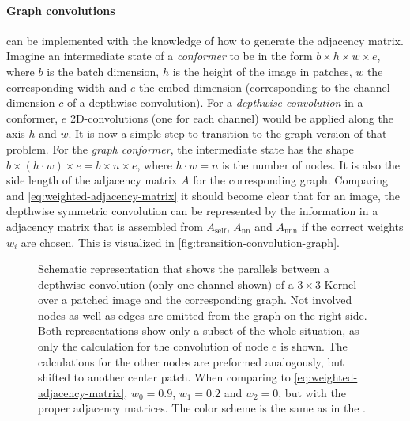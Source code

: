 \paragraph{Graph convolutions} can be implemented with the knowledge of how to generate the adjacency matrix.
Imagine an intermediate state of a \emph{conformer} to be in the form $b\times h\times w \times e$, where $b$ is the batch dimension, $h$ is the height of the image in patches, $w$ the corresponding width and $e$ the embed dimension (corresponding to the channel dimension $c$ of a depthwise convolution).
For a \emph{depthwise convolution} in a conformer, $e$ 2D-convolutions (one for each channel) would be applied along the axis $h$ and $w$. 
It is now a simple step to transition to the graph version of that problem.
For the \emph{graph conformer}, the intermediate state has the shape $b\times (h\cdot w) \times e = b\times n \times e$, where $h\cdot w = n$ is the number of nodes. 
It is also the side length of the adjacency matrix $A$ for the corresponding graph. 
Comparing %
and \autoref{eq:weighted-adjacency-matrix} it should become clear that for an image, the depthwise symmetric convolution can be represented by the information in a adjacency matrix that is assembled from $A_\mathrm{self}$, $A_\mathrm{nn}$ and $A_\mathrm{nnn}$ if the correct weights $w_i$ are chosen. This is visualized in \autoref{fig:transition-convolution-graph}.

\begin{figure}[htbp]
    \centering
    \caption{Schematic representation that shows the parallels between a depthwise convolution (only one channel shown) of a $3\times 3$ Kernel over a patched image and the corresponding graph. Not involved nodes as well as edges are omitted from the graph on the right side. Both representations show only a subset of the whole situation, as only the calculation for the convolution of node $e$ is shown. The calculations for the other nodes are preformed analogously, but shifted to another center patch. When comparing to \autoref{eq:weighted-adjacency-matrix}, $w_0=0.9$, $w_1=0.2$ and $w_2=0$, but with the proper adjacency matrices.
    The color scheme is the same as in the .}
    \label{fig:transition-convolution-graph}
\end{figure}

